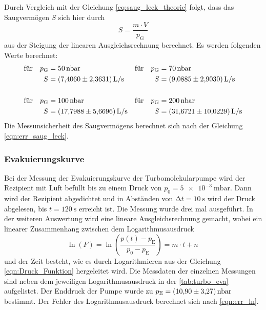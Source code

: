     \noindent Durch Vergleich mit der Gleichung \eqref{eq:saug_leck_theorie} folgt, dass das Saugvermögen $S$ sich hier durch
    \begin{equation*}
      S = \frac{m \cdot V}{p_\text{G}}
    \end{equation*}
    aus der Steigung der linearen Ausgleichsrechnung berechnet. Es werden folgenden Werte berechnet:
    \begin{align*}
      \text{für} \quad p_\text{G} &= \SI{50}{\nano\bar} & \text{für} \quad p_\text{G} &= \SI{70}{\nano\bar} \\
      S &= \SI{7.4060 \pm 2.3631}{L\per\second}  & S &= \SI{9.0885 \pm 2.903}{L\per\second}  \\
      \\
      \text{für} \quad p_\text{G} &= \SI{100}{\nano\bar} & \text{für} \quad p_\text{G} &= \SI{200}{\nano\bar} \\
      S &= \SI{17.7988 \pm 5.6696}{L\per\second}  & S &= \SI{31.6721 \pm 10.0229}{L\per\second}  
    \end{align*}
    Die Messunsicherheit des Saugvermögens berechnet sich nach der Gleichung \eqref{eqn:err_saug_leck}.

  \subsubsection{Evakuierungskurve}

    \noindent Bei der Messung der Evakuierungskurve der Turbomolekularpumpe wird der Rezipient mit Luft befüllt bis zu einem Druck von $p_0 = \SI{5e-3}{\milli\bar}$. Dann wird der Rezipient 
    abgedichtet und in Abständen von $\increment t = \SI{10}{\second}$ wird der Druck abgelesen, bis $ t = \SI{120}{\second}$ erreicht ist. Die Messung wurde drei mal ausgeführt.
    In der weiteren Auswertung wird eine lineare Ausgleichsrechnung gemacht, wobei ein linearer Zusammenhang zwischen dem Logarithmusausdruck 
    \begin{equation*}
      \ln(F) = \ln \left( \frac{p(t) - p_\text{E}}{p_0 - p_\text{E}}\right) = m \cdot t + n \, 
    \end{equation*} 
    und der Zeit besteht, wie es durch Logarithmieren aus der Gleichung \eqref{eqn:Druck_Funktion} hergeleitet wird. Die Messdaten der einzelnen Messungen sind neben dem jeweiligen Logarithmusausdruck in der \autoref{tab:turbo_eva} aufgelistet. 
    Der Enddruck der Pumpe wurde zu $p_\text{E} = \SI{10.9 \pm 3.27}{\nano\bar}$ bestimmt. Der Fehler des Logarithmusausdruck berechnet sich nach \eqref{eqn:err_ln}.
  

